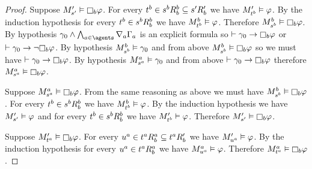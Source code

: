 \begin{proof}
Suppose $\kPModelP{\kStateSP} \entails \necessaryB \phi$.
For every $\kStateT[\agentB] \in \kSuccessorsB[\agentB]{\kStateS[\agentB]} \subseteq \kSuccessorsPB{\kStateSP}$ we have $\kPModelP{\kStateT[\agentB]} \entails \phi$.
By the induction hypothesis for every $\kStateT[\agentB] \in \kSuccessorsB[\agentB]{\kStateS[\agentB]}$ we have $\kPModel[\agentB]{\kStateT[\agentB]} \entails \phi$.
Therefore $\kPModel[\agentB]{\kStateS[\agentB]} \entails \necessaryB \phi$.
By hypothesis $\gamma_0 \land \bigwedge_{\agentA \in \agents} \coversA \Gamma_\agentA$ is an explicit formula so $\proves \gamma_0 \implies \necessaryB \phi$ or $\proves \gamma_0 \implies \lnot \necessaryB \phi$.
By hypothesis $\kPModel[\agentB]{\kStateS[\agentB]} \entails \gamma_0$ and from above $\kPModel[\agentB]{\kStateS[\agentB]} \entails \necessaryB \phi$ so we must have $\proves \gamma_0 \implies \necessaryB \phi$.
By hypothesis $\kPModel[\agentA]{\kStateS[\agentA]} \entails \gamma_0$ and from above $\proves \gamma_0 \implies \necessaryB \phi$ therefore $\kPModel[\agentA]{\kStateS[\agentA]} \entails \necessaryB \phi$.

Suppose $\kPModel[\agentA]{\kStateS[\agentA]} \entails \necessaryB \phi$.
From the same reasoning as above we must have $\kPModel[\agentB]{\kStateS[\agentB]} \entails \necessaryB \phi$.
For every $\kStateT[\agentB] \in \kSuccessorsB[\agentB]{\kStateS[\agentB]}$ we have $\kPModel[\agentB]{\kStateT[\agentB]} \entails \phi$.
By the induction hypothesis we have $\kPModelP{\kStateSP} \entails \phi$ and for every $\kStateT[\agentB] \in \kSuccessorsB[\agentB]{\kStateS[\agentB]}$ we have $\kPModelP{\kStateT[\agentB]} \entails \phi$.
Therefore $\kPModelP{\kStateSP} \entails \necessaryB \phi$.

Suppose $\kPModelP{\kStateT[\agentA]} \entails \necessaryB \phi$.
For every $\kStateU[\agentA] \in \kSuccessorsB[\agentA]{\kStateT[\agentA]} \subseteq \kSuccessorsPB{\kStateT[\agentA]}$ we have $\kPModelP{\kStateU[\agentA]} \entails \phi$.
By the induction hypothesis for every $\kStateU[\agentA] \in \kSuccessorsB[\agentA]{\kStateT[\agentA]}$ we have $\kPModel[\agentA]{\kStateU[\agentA]} \entails \phi$.
Therefore $\kPModel[\agentA]{\kStateT[\agentA]} \entails \necessaryB \phi$.


\end{proof}
